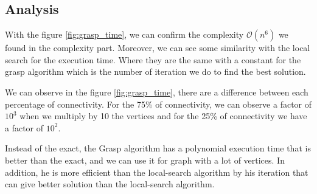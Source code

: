 
\subsection{Analysis}

With the figure \ref{fig:grasp_time}, we can confirm the complexity $\mathcal{O}(n^6)$ we found in the complexity part.
Moreover, we can see some similarity with the local search for the execution time. Where they are the same with a constant for the grasp algorithm 
which is the number of iteration we do to find the best solution.
\bigskip

We can observe in the figure \ref{fig:grasp_time}, there are a difference between each percentage of connectivity.
For the 75\% of connectivity, we can observe a factor of $10^3$ when we multiply by 10 the vertices and for the 25\% of connectivity
we have a factor of $10^2$.
\bigskip

Instead of the exact, the Grasp algorithm has a polynomial execution time that is better than the exact, and we can use it for graph with a lot of vertices.
In addition, he is more efficient than the local-search algorithm by his iteration that can give better solution than the local-search algorithm.
